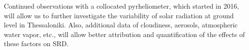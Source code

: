 \documentclass[applsci,article,accept,moreauthors,pdftex]{Definitions/mdpi}
\begin{document}
Continued observations with a collocated pyrheliometer, which started in
2016, will allow us to further investigate the variability of solar
radiation at ground level in Thessaloniki. Also, additional data of
cloudiness, aerosols, atmospheric water vapor, etc., will allow better
attribution and quantification of the effects of these factors on SRD.


\vspace{6pt}


\authorcontributions{\hl{  } %
}


\institutionalreview{\hl{  } %
}
\end{document}
